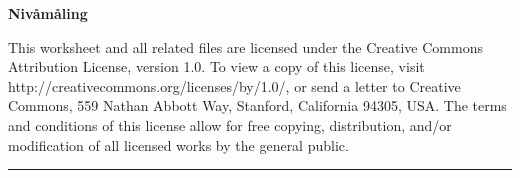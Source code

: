 
\centerline{\bf Niv{\aa}m{\aa}ling}  \bigskip

This worksheet and all related files are licensed under the Creative Commons Attribution License, version 1.0.  To view a copy of this license, visit http://creativecommons.org/licenses/by/1.0/, or send a letter to Creative Commons, 559 Nathan Abbott Way, Stanford, California 94305, USA.  The terms and conditions of this license allow for free copying, distribution, and/or modification of all licensed works by the general public.

\bigskip 
 
\hrule

\vfil \eject

